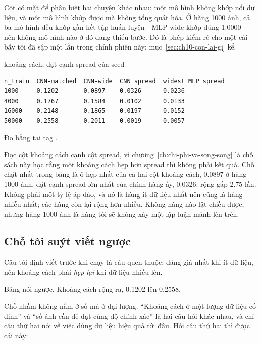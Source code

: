 Cột  có mặt để phân biệt hai chuyện khác nhau: một mô hình
không khớp nổi dữ liệu, và một mô hình khớp được mà không tổng quát hóa. Ở hàng
1000 ảnh, cả ba mô hình đều khớp gần hết tập huấn luyện - MLP wide khớp đúng
1.0000 - nên không mô hình nào ở đó đang thiếu bước. Đó là phép kiểm rẻ cho một
cái bẫy tôi đã sập một lần trong chính phiên này; mục~\ref{sec:ch10-con-lai-gi}
kể.

\begin{measured}{khoảng cách, đặt cạnh spread của seed}
\begin{verbatim}
n_train  CNN-matched  CNN-wide  CNN spread  widest MLP spread
1000     0.1202       0.0897    0.0326      0.0236
4000     0.1767       0.1584    0.0102      0.0133
16000    0.2148       0.1865    0.0197      0.0152
50000    0.2558       0.2011    0.0019      0.0057
\end{verbatim}

Đo bằng  tại tag .
\end{measured}

Đọc cột khoảng cách cạnh cột spread, vì chương~\ref{ch:chi-phi-va-song-song} là
chỗ sách này học rằng một khoảng cách hẹp hơn spread thì không phải kết quả.
Chỗ chặt nhất trong bảng là ô hẹp nhất của cả hai cột khoảng cách, 0.0897 ở
hàng 1000 ảnh, đặt cạnh spread lớn nhất của chính hàng ấy, 0.0326: rộng gấp
2.75 lần. Không phải một tỷ lệ áp đảo, và nó là hàng ít dữ liệu nhất nên cũng
là hàng nhiễu nhất; các hàng còn lại rộng hơn nhiều. Không hàng nào lật chiều
được, nhưng hàng 1000 ảnh là hàng tôi sẽ không xây một lập luận mảnh lên trên.

\subsection*{Chỗ tôi suýt viết ngược}

%
Câu tôi định viết trước khi chạy là câu quen thuộc:
 đáng giá nhất khi ít dữ liệu, nên
khoảng cách phải \emph{hẹp lại} khi dữ liệu nhiều lên.

Bảng nói ngược. Khoảng cách rộng ra, 0.1202 lên 0.2558.

Chỗ nhầm không nằm ở số mà ở đại lượng. \enquote{Khoảng cách ở một lượng dữ
liệu cố định} và \enquote{số ảnh cần để đạt cùng độ chính xác} là hai câu hỏi
khác nhau, và chỉ câu thứ hai nói về việc dùng dữ liệu hiệu quả tới đâu. Hỏi
câu thứ hai thì được cái này:


